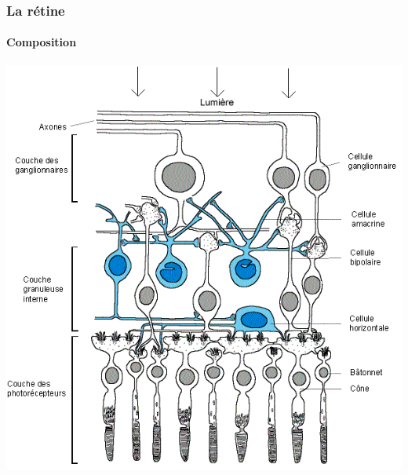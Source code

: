 \documentclass[red]{beamer}
\begin{document}
	\begin{frame}
	\frametitle{La rétine}
	\framesubtitle{Composition}
	\begin{center}
    \includegraphics[scale=0.35]{retine.png}
    \end{center}
	\end{frame}
\end{document}
